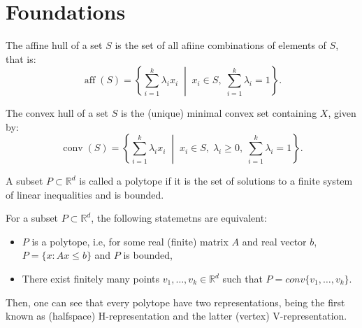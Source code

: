 \section{Foundations}

\begin{definition}
The affine hull of a set $S$ is the set of all afiine combinations of elements of $S$, that is:
\[
\operatorname{aff}(S) = \left\{ \sum_{i=1}^{k} \lambda_i x_i \;\middle|\; x_i \in S,\; \sum_{i=1}^{k} \lambda_i = 1 \right\}.
\]
\end{definition}

\begin{definition}
The convex hull of a set $S$ is the (unique) minimal convex set containing $X$, given by:
\[
\operatorname{conv}(S) = \left\{ \sum_{i=1}^{k} \lambda_i x_i \;\middle|\; x_i \in S,\; \lambda_i \geq 0,\; \sum_{i=1}^{k} \lambda_i = 1 \right\}.
\]
\end{definition}

\begin{definition}[Polytope]
A subset $P \subset \mathbb{R}^d$ is called a polytope if it is the set of solutions to a finite system of linear inequalities and is bounded.
\end{definition}

\begin{theorem}
For a subset $P \subset \mathbb{R}^d$, the following statemetns are equivalent:
\begin{itemize}
    \item $P$ is a polytope, i.e, for some real (finite) matrix $A$ and real vector $b$, $P = \{x : Ax \leq b\}$ and $P$ is bounded,
    \item There exist finitely many points $v_1, \dotsc, v_k \in \mathbb{R}^d$ such that $P = conv\{v_1, \dotsc,v_k\}$.
\end{itemize}
Then, one can see that every polytope have two representations, being the first known as (halfspace) H-representation and the latter (vertex) V-representation.
\end{theorem}

